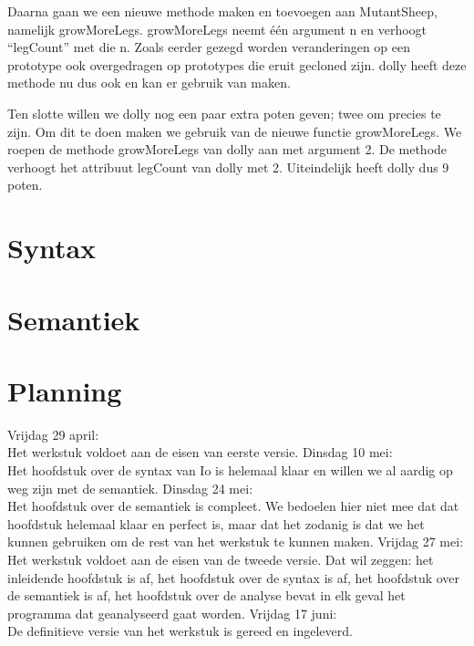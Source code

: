 \documentclass[12pt]{article}
\begin{document}
Daarna gaan we een nieuwe methode maken en toevoegen aan MutantSheep, namelijk growMoreLegs.
growMoreLegs neemt \'e\'en argument n en verhoogt ``legCount'' met die n. Zoals eerder gezegd worden veranderingen op een prototype ook overgedragen op prototypes die eruit gecloned zijn. dolly heeft deze methode nu dus ook en kan er gebruik van maken.\newline

Ten slotte willen we dolly nog een paar extra poten geven; twee om precies te zijn.
Om dit te doen maken we gebruik van de nieuwe functie growMoreLegs.
We roepen de methode growMoreLegs van dolly aan met argument 2.
De methode verhoogt het attribuut legCount van dolly met 2.
Uiteindelijk heeft dolly dus 9 poten.

\pagebreak
\section{Syntax}

\pagebreak
\section{Semantiek}

\appendix

\section{Planning}
Vrijdag 29 april: \\Het werkstuk voldoet aan de eisen van eerste versie.\newline\newline %
Dinsdag 10 mei: \\Het hoofdstuk over de syntax van Io is helemaal klaar en willen we al aardig op weg zijn met de semantiek.\newline\newline
Dinsdag 24 mei: \\Het hoofdstuk over de semantiek is compleet. We bedoelen hier niet mee dat dat hoofdstuk helemaal klaar en perfect is, maar
dat het zodanig is dat we het kunnen gebruiken om de rest van het werkstuk te kunnen maken.\newline\newline
Vrijdag 27 mei: \\Het werkstuk voldoet aan de eisen van de tweede versie. Dat wil zeggen: het inleidende hoofdstuk is af, het hoofdstuk over de syntax is af, het hoofdstuk over de semantiek is af, het hoofdstuk over de analyse bevat in elk geval het programma dat geanalyseerd gaat worden.\newline\newline
Vrijdag 17 juni: \\De definitieve versie van het werkstuk is gereed en ingeleverd.
\end{document}
